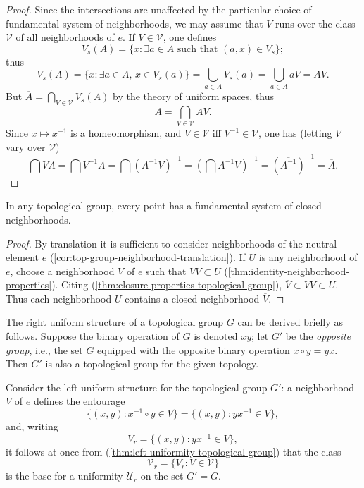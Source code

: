 \begin{proof}
    Since the intersections are unaffected by the particular choice of fundamental system of neighborhoods, we may assume that \( V \) runs over the class \( \mathscr{V} \) of all neighborhoods of \( e \).
    If \( V \in \mathscr{V} \), one defines
    \[
        V_s(A) = \{ x : \exists a \in A \text{ such that } (a, x) \in V_s \};
    \]
    thus
    \[
        V_s(A) = \{ x : \exists a \in A,\, x \in V_s(a) \} = \bigcup_{a \in A} V_s(a) = \bigcup_{a \in A} aV = AV.
    \]
    But \( \overline{A} = \bigcap_{V \in \mathscr{V}} V_s(A) \) by the theory of uniform spaces, thus
    \[
        \overline{A} = \bigcap_{V \in \mathscr{V}} AV.
    \]
    Since \( x \mapsto x^{-1} \) is a homeomorphism, and \( V \in \mathscr{V} \) iff \( V^{-1} \in \mathscr{V} \), one has (letting \( V \) vary over \( \mathscr{V} \))
    \[
        \bigcap VA = \bigcap V^{-1}A = \bigcap (A^{-1}V)^{-1} = \left(\bigcap A^{-1}V\right)^{-1} = (\overline{A^{-1}})^{-1} = \overline{A}.
    \]
\end{proof}

\begin{corollary}
    In any topological group, every point has a fundamental system of closed neighborhoods.
\end{corollary}

\begin{proof}
    By translation it is sufficient to consider neighborhoods of the neutral element \( e \) (\ref{cor:top-group-neighborhood-translation}).
    If \( U \) is any neighborhood of \( e \), choose a neighborhood \( V \) of \( e \) such that
    \( VV \subset U \) (\ref{thm:identity-neighborhood-properties}). Citing (\ref{thm:closure-properties-topological-group}), \( \overline{V} \subset VV \subset U \).
    Thus each neighborhood \( U \) contains a closed neighborhood \( \overline{V} \).
\end{proof}

\begin{theorem}
    \label{thm:right-uniform-structure-topological-group}

    The right uniform structure of a topological group \( G \) can be derived briefly as follows.
    Suppose the binary operation of \( G \) is denoted \( xy \); let \( G' \) be the \textit{opposite group},
    i.e., the set \( G \) equipped with the opposite binary operation \( x \circ y = yx \).
    Then \( G' \) is also a topological group for the given topology.

    Consider the left uniform structure for the topological group \( G' \):
    a neighborhood \( V \) of \( e \) defines the entourage
    \[
        \{(x, y) : x^{-1} \circ y \in V\} = \{(x, y) : yx^{-1} \in V\},
    \]
    and, writing
    \[
        V_r = \{(x, y) : yx^{-1} \in V\},
    \]
    it follows at once from (\ref{thm:left-uniformity-topological-group}) that the class
    \[
        \mathcal{V}_r = \{V_r : V \in \mathcal{V}\}
    \]
    is the base for a uniformity \( \mathcal{U}_r \) on the set \( G' = G \).
\end{theorem}


